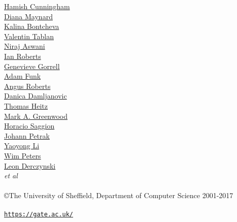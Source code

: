 \documentclass[12pt,a4paper,fleqn,final]{book}
\newif\ifprintedbook
\newif\ifhtml
\newcommand{\htlink}[2]{\href{#1}{#2}}
\newcommand{\htlatex}[1]{#1}
\renewcommand{\htlatex}[1]{}
\begin{document}
\begin{titlepage}
\begin{center}
{} %
\end{center}

\ifhtml
  \newcommand{\taoAuthorSep}{, }
\else
  \newcommand{\taoAuthorSep}{\\ \hspace*{0.75cm}}
\fi %

{
\begin{center}
\hspace*{0.75cm}
\htlink{http://www.dcs.shef.ac.uk/\string ~hamish/}{Hamish Cunningham}%
\taoAuthorSep
\htlink{http://www.dcs.shef.ac.uk/\string ~diana/}{Diana Maynard}%
\taoAuthorSep
\htlink{http://www.dcs.shef.ac.uk/\string ~kalina/}{Kalina Bontcheva}%
\taoAuthorSep
\htlink{http://www.dcs.shef.ac.uk/\string ~valyt/}{Valentin Tablan}%
\taoAuthorSep
\htlink{http://www.dcs.shef.ac.uk/\string ~niraj/}{Niraj Aswani}%
\taoAuthorSep
\htlink{http://www.dcs.shef.ac.uk/\string ~ian/}{Ian Roberts}%
\taoAuthorSep
\htlink{http://www.dcs.shef.ac.uk/\string ~genevieve/}{Genevieve Gorrell}%
\taoAuthorSep
\htlink{http://www.dcs.shef.ac.uk/\string ~adam/}{Adam Funk}%
\taoAuthorSep
\htlink{http://www.dcs.shef.ac.uk/\string ~angus/}{Angus Roberts}%
\taoAuthorSep
\htlink{http://www.dcs.shef.ac.uk/\string ~danica/}{Danica Damljanovic}%
\taoAuthorSep
\htlink{http://thomasheitz.free.fr/text.mining.researcher/}{Thomas Heitz}%
\taoAuthorSep
\htlink{http://www.dcs.shef.ac.uk/\string ~mark/}{Mark A. Greenwood}%
\taoAuthorSep
\htlink{http://www.dcs.shef.ac.uk/\string ~saggion/}{Horacio Saggion}%
\taoAuthorSep
\htlink{http://www.ofai.at/\string ~johann.petrak/}{Johann Petrak}%
\taoAuthorSep
\htlink{http://personalpages.manchester.ac.uk/staff/Yaoyong.Li/}{Yaoyong Li}%
\taoAuthorSep
\htlink{http://www.dcs.shef.ac.uk/\string ~wim/}{Wim Peters}%
\taoAuthorSep
\htlink{http://www.dcs.shef.ac.uk/\string ~leon/}{Leon Derczynski}%
\taoAuthorSep
\textit{et al} \\
\hspace*{1cm}
\mbox{ } \\
\hspace*{0.75cm} \copyright The University of Sheffield, Department of Computer Science 2001-2017 \\
\mbox{ } \\
\hspace*{0.75cm} \htlink{https://gate.ac.uk/}{\tt https://gate.ac.uk/} \\
\vspace*{0.2in}
\htlatex{
  \hspace*{0.75cm}
  \ifprintedbook \else%
}
\end{center}}
\end{titlepage}
\end{document}
